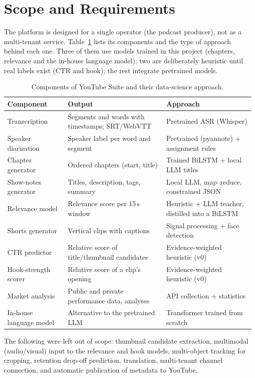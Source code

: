 \section{Scope and Requirements}

The platform is designed for a single operator (the podcast producer), not as a multi-tenant service. Table~\ref{tab:components} lists its components and the type of approach behind each one. Three of them use models trained in this project (chapters, relevance and the in-house language model); two are deliberately heuristic until real labels exist (CTR and hook); the rest integrate pretrained models.

\begin{table}[H]
\centering
\caption{Components of YouTube Suite and their data-science approach.}
\label{tab:components}
\small
\begin{tabular}{@{}p{3.6cm}p{5.6cm}p{5.0cm}@{}}
\toprule
\textbf{Component} & \textbf{Output} & \textbf{Approach} \\
\midrule
Transcription & Segments and words with timestamps; SRT/WebVTT & Pretrained ASR (Whisper) \\
Speaker diarization & Speaker label per word and segment & Pretrained (pyannote) + assignment rules \\
Chapter generator & Ordered chapters (start, title) & Trained BiLSTM + local LLM titles \\
Show-notes generator & Titles, description, tags, summary & Local LLM, map--reduce, constrained JSON \\
Relevance model & Relevance score per 15\,s window & Heuristic + LLM teacher, distilled into a BiLSTM \\
Shorts generator & Vertical clips with captions & Signal processing + face detection \\
CTR predictor & Relative score of title/thumbnail candidates & Evidence-weighted heuristic (v0) \\
Hook-strength scorer & Relative score of a clip's opening & Evidence-weighted heuristic (v0) \\
Market analysis & Public and private performance data, analyses & API collection + statistics \\
In-house language model & Alternative to the pretrained LLM & Transformer trained from scratch \\
\bottomrule
\end{tabular}
\end{table}

The following were left out of scope: thumbnail candidate extraction, multimodal (audio/visual) input to the relevance and hook models, multi-object tracking for cropping, retention drop-off prediction, translation, multi-tenant channel connection, and automatic publication of metadata to YouTube.

